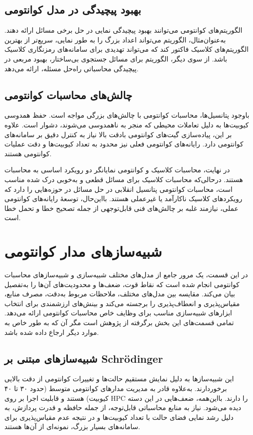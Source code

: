 \subsection{بهبود پیچیدگی در مدل کوانتومی}
الگوریتم‌های کوانتومی می‌توانند بهبود پیچیدگی نمایی در حل برخی مسائل ارائه دهند. به‌عنوان‌مثال، الگوریتم  می‌تواند اعداد بزرگ را به طور نمایی، سریع‌تر از بهترین الگوریتم‌های کلاسیک فاکتور کند که می‌تواند تهدیدی برای سامانه‌های رمزنگاری کلاسیک باشد. از سوی دیگر، الگوریتم  برای مسائل جستجوی بی‌ساختار، بهبود مربعی در پیچیدگی محاسباتی راه‌حل مسئله، ارائه می‌دهد.

\subsection{چالش‌های محاسبات کوانتومی}
باوجود پتانسیل‌ها، محاسبات کوانتومی با چالش‌های بزرگی مواجه است. حفظ همدوسی کیوبیت‌ها به دلیل تعاملات محیطی که منجر به ناهمدوسی می‌شوند، دشوار است. علاوه بر این، پیاده‌سازی گیت‌های کوانتومی بادقت بالا نیاز به کنترل دقیق بر سامانه‌های کوانتومی دارد. رایانه‌های کوانتومی فعلی نیز محدود به تعداد کیوبیت‌ها و دقت عملیات کوانتومی هستند.

در نهایت، محاسبات کلاسیک و کوانتومی نمایانگر دو رویکرد اساسی به محاسبات هستند. درحالی‌که محاسبات کلاسیک برای مسائل قطعی و به‌خوبی درک شده مناسب است، محاسبات کوانتومی پتانسیل انقلابی در حل مسائل در حوزه‌هایی را دارد که رویکردهای کلاسیک ناکارآمد یا غیرعملی هستند. بااین‌حال، توسعهٔ رایانه‌های کوانتومی عملی، نیازمند غلبه بر چالش‌های فنی قابل‌توجهی از جمله تصحیح خطا و تحمل خطا است.

\section{شبیه‌سازهای مدار کوانتومی}
\label{sec:simulators}
در این قسمت، یک مرور جامع از مدل‌های مختلف شبیه‌سازی و شبیه‌سازهای محاسبات کوانتومی انجام شده است که نقاط قوت، ضعف‌ها و محدودیت‌های آن‌ها را به‌تفصیل بیان می‌کند. مقایسه بین مدل‌های مختلف، ملاحظات مربوط به‌دقت، مصرف منابع، مقیاس‌پذیری و انعطاف‌پذیری را برجسته می‌کند و بینش‌های ارزشمندی برای انتخاب ابزارهای شبیه‌سازی مناسب برای وظایف خاص محاسبات کوانتومی ارائه می‌دهد. تمامی قسمت‌های این بخش برگرفته از پژوهش \cite{young_simulating_2023} است مگر آن که به طور خاص به موارد دیگر ارجاع داده شده باشد.

\subsection{شبیه‌سازهای مبتنی بر Schrödinger}
این شبیه‌سازها به دلیل نمایش مستقیم حالت‌ها و تغییرات کوانتومی از دقت بالایی برخوردارند. به‌علاوه قادر به مدیریت مدارهای کوانتومی متوسط (حدود ۳۰ تا ۴۰ کیوبیت) هستند و قابلیت اجرا بر روی HPC را دارند. بااین‌همه، ضعف‌هایی در این دسته دیده می‌شود. نیاز به منابع محاسباتی قابل‌توجه، از جمله حافظه و قدرت پردازش، به دلیل رشد نمایی فضای حالت با تعداد کیوبیت‌ها و در نتیجه عدم مقیاس‌پذیری برای سامانه‌های بسیار بزرگ، نمونه‌ای از آن‌ها هستند.


